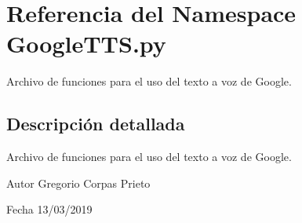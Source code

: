 \hypertarget{namespaceGoogleTTS_1_1py}{}\section{Referencia del Namespace Google\+T\+T\+S.\+py}
\label{namespaceGoogleTTS_1_1py}


Archivo de funciones para el uso del texto a voz de Google.  




\subsection{Descripción detallada}
Archivo de funciones para el uso del texto a voz de Google. 

\begin{DoxyAuthor}{Autor}
Gregorio Corpas Prieto 
\end{DoxyAuthor}
\begin{DoxyDate}{Fecha}
13/03/2019 
\end{DoxyDate}

